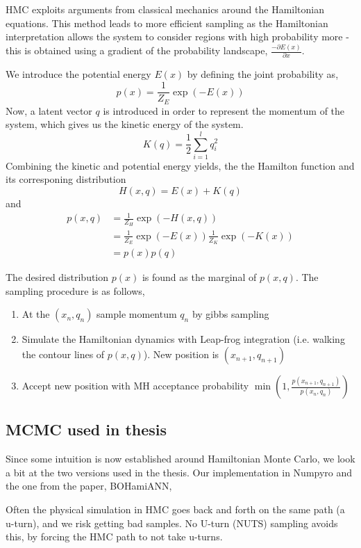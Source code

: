 \begin{testexample}
HMC exploits arguments from classical mechanics around the Hamiltonian equations.
This method leads to more efficient sampling as the Hamiltonian interpretation allows the system to
consider regions with high probability more - this is obtained using a gradient of the probability
landscape, $\frac{-\partial E(x)}{\partial x} $.
 
We introduce the potential energy $E(x)$ by defining the joint probability as, 
$$p(x) = \frac{1}{Z_E}\exp(-E(x))$$ Now, a latent vector $q$ is introduced in order to represent the
momentum of the system, which gives us the kinetic energy of the system. 
$$K(q) = \frac{1}{2}\sum_{i=1}^l q_i^2$$ Combining the kinetic and potential energy yields, the the
Hamilton function and its corresponing distribution
$$H(x,q)= E(x)+K(q)$$
and 
\begin{align}
    p(x,q) &= \frac{1}{Z_H} \exp(-H(x,q))\\
    &= \frac{1}{Z_E} \exp(-E(x))\frac{1}{Z_K} \exp(-K(x))\\
    &= p(x)p(q)
\end{align}

The desired distribution $p(x)$ is found as the marginal of $p(x,q)$.
The sampling procedure is as follows, 
\begin{enumerate}[noitemsep]
    \item At the $(x_n,q_n)$ sample momentum $q_n$ by gibbs sampling
    \item Simulate the Hamiltonian dynamics with Leap-frog integration (i.e. walking the contour lines of $p(x,q)$).
    New position is $(x_{n+1}, q_{n+1})$
    \item Accept new position with MH acceptance probability $\min(1,\frac{p(x_{n+1}, q_{n+1})}{p(x_{n}, q_{n})} )$
\end{enumerate}
\end{testexample}

\subsection{MCMC used in thesis}
Since some intuition is now established around Hamiltonian Monte Carlo, 
we look a bit at the two versions used in the thesis. Our implementation in Numpyro
and the one from the paper, BOHamiANN, 

Often the physical simulation in HMC goes back and forth on the same path (a u-turn), and we risk getting bad samples.
No U-turn (NUTS) sampling avoids this, by forcing the HMC path to not take u-turns. 

